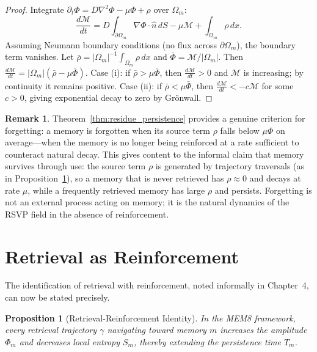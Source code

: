 \documentclass[12pt, oneside]{book}
\theoremstyle{flyxion}
\newtheorem{proposition}[theorem]{Proposition}
\theoremstyle{definition}
\newtheorem{remark}[theorem]{Remark}
\begin{document}
\begin{proof}
Integrate $\partial_t\Phi = D\nabla^2\Phi - \mu\Phi + \rho$
over $\Omega_m$:
\[
\frac{d\mathcal{M}}{dt} = D\int_{\partial\Omega_m}
\nabla\Phi \cdot \hat{n}\,dS - \mu\mathcal{M} +
\int_{\Omega_m}\rho\,dx.
\]
Assuming Neumann boundary conditions (no flux across
$\partial\Omega_m$), the boundary term vanishes. Let
$\bar\rho = |\Omega_m|^{-1}\int_{\Omega_m}\rho\,dx$ and
$\bar\Phi = \mathcal{M}/|\Omega_m|$. Then
$\frac{d\mathcal{M}}{dt} = |\Omega_m|(\bar\rho - \mu\bar\Phi)$.
Case (i): if $\bar\rho > \mu\bar\Phi$, then $\frac{d\mathcal{M}}{dt}
> 0$ and $\mathcal{M}$ is increasing; by continuity it remains
positive. Case (ii): if $\bar\rho < \mu\bar\Phi$, then
$\frac{d\mathcal{M}}{dt} < -c\mathcal{M}$ for some $c > 0$,
giving exponential decay to zero by Grönwall.
\end{proof}

\begin{remark}
Theorem~\ref{thm:residue_persistence} provides a genuine
criterion for forgetting: a memory is forgotten when its
source term $\rho$ falls below $\mu\Phi$ on average---when
the memory is no longer being reinforced at a rate sufficient
to counteract natural decay. This gives content to the
informal claim that memory survives through use: the source
term $\rho$ is generated by trajectory traversals (as in
Proposition~\ref{prop:retrieval_reinforce}), so a memory
that is never retrieved has $\rho \approx 0$ and decays
at rate $\mu$, while a frequently retrieved memory has
large $\rho$ and persists. Forgetting is not an external
process acting on memory; it is the natural dynamics of
the RSVP field in the absence of reinforcement.
\end{remark}

\section{Retrieval as Reinforcement}

The identification of retrieval with reinforcement,
noted informally in Chapter~4, can now be stated
precisely.

\begin{proposition}[Retrieval-Reinforcement Identity]
\label{prop:retrieval_reinforce}
In the MEM\textbar{}8 framework, every retrieval
trajectory $\gamma$ navigating toward memory $m$
increases the amplitude $\Phi_m$ and decreases
local entropy $S_m$, thereby extending the
persistence time $T_m$.
\end{proposition}
\end{document}
